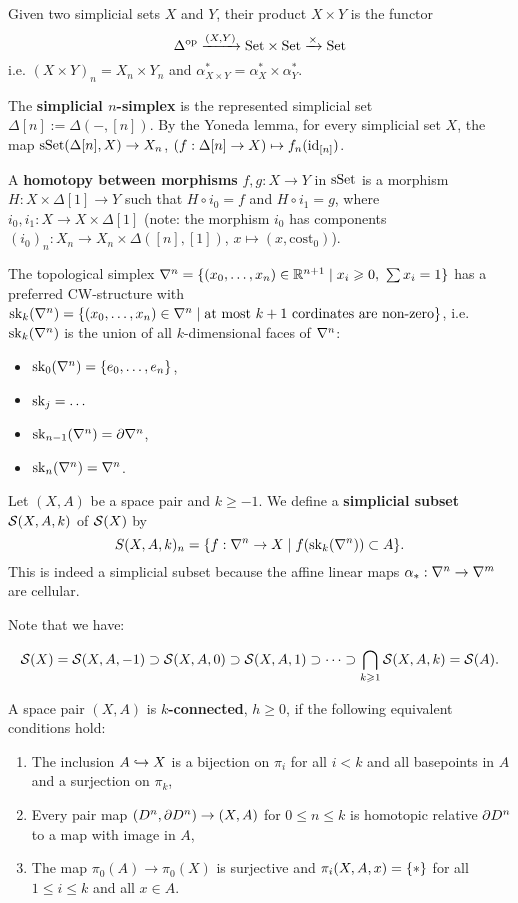 

Given two simplicial sets $X$ and $Y$, their product $X\times Y$ is the functor \[\Delta^\op\xto{(X,Y)}\Set\times\Set\xto{\times}\Set\] i.e. $(X\times Y)_n=X_n\times Y_n$ and $\alpha^*_{X\times Y}=\alpha^*_X\times\alpha^*_Y$.

The \textbf{simplicial $n$-simplex} is the represented simplicial set $\Delta[n]:=\Delta(-,[n])$. By the Yoneda lemma, for every simplicial set $X$, the map $\sSet(\Delta[n],X)\to X_n$, $(f:\Delta[n]\to X)\mapsto f_n(\id_{[n]})$.

A \textbf{homotopy between morphisms} $f,g:X\to Y$ in $\sSet$ is a morphism $H:X\times\Delta[1]\to Y$ such that $H\circ i_0=f$ and $H\circ i_1=g$, where $i_0,i_1:X\to X\times\Delta[1]$ (note: the morphism $i_0$ has components $(i_0)_n:X_n\to X_n\times\Delta([n],[1])$, $x\mapsto(x,\text{cost}_0)$).

The topological simplex $\nabla^n=\cb{(\xso)\in\R^{n+1}\mid x_i\geq0,\ \sum x_i=1}$ has a preferred CW-structure with $\sk_k(\nabla^n)=\cb{(\xso)\in\nabla^n\mid\text{at most }k+1\text{ cordinates are non-zero}}$, i.e. $\sk_k(\ns)$ is the union of all $k$-dimensional faces of $\ns$:
\begin{itemize}
    \item $\sk_0(\nabla^n)=\cb{\nno{e}{n}}$,
    \item $\sk_j=\dots$
    \item $\sk_{n-1}(\nabla^n)=\de\nabla^n$,
    \item $\sk_n(\nabla^n)=\nabla^n$.
\end{itemize}\medskip

Let $(X,A)$ be a space pair and $k\geq-1$. We define a \textbf{simplicial subset} $\S(X,A,k)$ of $\S(X)$ by
\[S(X,A,k)_n=\cb{f:\ns\to X\mid f(\sk_k(\ns))\subset A}.\]
This is indeed a simplicial subset because the affine linear maps $\alpha_*:\ns\to\ms$ are cellular.

Note that we have:

\[\S(X)=\S(X,A,-1)\supset \S(X,A,0)\supset \S(X,A,1)\supset\dots\supset\bigcap_{k\geq1}\S(X,A,k)=\S(A).\]

A space pair $(X,A)$ is \textbf{$k$-connected}, $h\geq0$, if the following equivalent conditions hold:
\begin{enumerate}[label={(\alph*)},topsep=0.5\thmsep]
    \item The inclusion $A\hto X$ is a bijection on $\pi_i$ for all $i<k$ and all basepoints in $A$ and a surjection on $\pi_k$,
    \item Every pair map $(D^n,\de D^n)\to (X,A)$ for $0\leq n\leq k$ is homotopic relative $\de D^n$ to a map with image in $A$,
    \item The map $\pi_0(A)\to \pi_0(X)$ is surjective and $\pi_i(X,A,x)=\cb{*}$ for all $1\leq i\leq k$ and all $x\in A$.
\end{enumerate}

